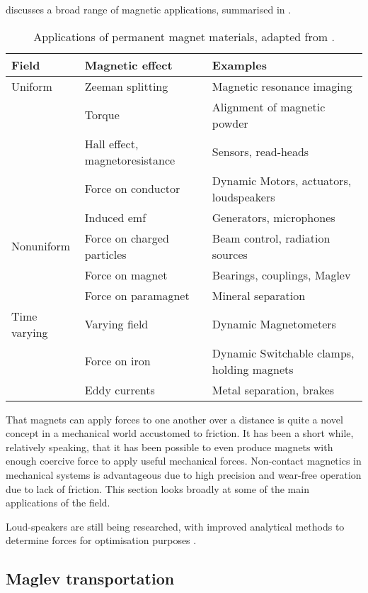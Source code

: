 \textcite{coey2002} discusses a broad range of magnetic applications,
summarised in .

\begin{table}
\begin{wide}
\begin{tabular}{@{}lll@{}}
\toprule
Field & Magnetic effect & Examples \\
\midrule
Uniform & Zeeman splitting & Magnetic resonance imaging \\
& Torque & Alignment of magnetic powder \\
& Hall effect, magnetoresistance & Sensors, read-heads \\
& Force on conductor & Dynamic Motors, actuators, loudspeakers \\
& Induced emf & Generators, microphones \\
Nonuniform & Force on charged particles & Beam control, 
radiation sources %
\\
& Force on magnet & Bearings, couplings, Maglev \\
& Force on paramagnet & Mineral separation \\
Time varying & Varying field & Dynamic Magnetometers \\
& Force on iron & Dynamic Switchable clamps, holding magnets \\
& Eddy currents & Metal separation, brakes \\
\bottomrule
\end{tabular}
\end{wide}
\caption{Applications of permanent magnet materials, 
adapted from \textcite{coey2002}.}
\end{table}

That magnets can apply forces to one another over a distance is quite a novel concept in a mechanical world accustomed to friction.
It has been a short while, relatively speaking, that it has been possible to even produce magnets with enough coercive force to apply useful mechanical forces.
Non-contact magnetics in mechanical systems is advantageous due to high precision and wear-free operation due to lack of friction.
This section looks broadly at some of the main applications of the field.

Loud-speakers are still being researched, with improved analytical methods to determine forces for optimisation purposes \cite{merit2009}.

\subsection{Maglev transportation}

